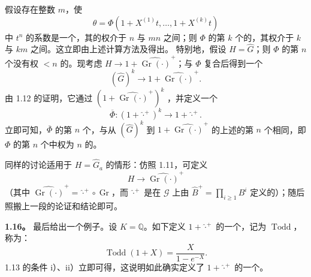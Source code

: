 假设存在整数 $m$，使
\[
\theta=\Phi(1+X^{(1)}t,\ldots,1+X^{(k)}t)
\]
中 $t^n$ 的系数是一个，其的权介于 $n$ 与 $mn$ 之间；则 $\Phi$ 的第 $k$ 个的，其权介于 $k$ 与 $km$ 之间。这立即由上述计算方法及得出。
特别地，假设 $H=\widehat G$；则 $\Phi$ 的第 $n$ 个没有权 $<n$ 的。现考虑 $H\longrightarrow1+\widehat{\operatorname{Gr}(\cdot)}^{+}$；与 $\Phi$ 复合后得到一个
\[
(\widehat G)^k\longrightarrow1+\widehat{\operatorname{Gr}(\cdot)}^{+}.
\]
由 1.12 的证明，它通过 $(1+\widehat{\operatorname{Gr}(\cdot)}^{+})^k$ ，并定义一个
\[
\overline\Phi:(1+\widehat{\cdot}^{+})^k\longrightarrow1+\widehat{\cdot}^{+}.
\]
立即可知，$\overline\Phi$ 的第 $n$ 个，与从 $(\widehat G)^k$ 到 $1+\widehat{\operatorname{Gr}(\cdot)}^{+}$ 的上述的第 $n$ 个相同，即 $\Phi$ 的第 $n$ 个中权为 $n$ 的。

同样的讨论适用于 $H=\widehat G_a$ 的情形：仿照 1.11，可定义
\[
H\longrightarrow\widehat{\operatorname{Gr}(\cdot)}^{+}
\]
（其中 $\widehat{\operatorname{Gr}(\cdot)}^{+}=\widehat{\cdot}^{+}\circ\operatorname{Gr}$，而 $\widehat{\cdot}^{+}$ 是在 $\mathscr G$ 上由 $\widehat B^+=\prod_{i\geqslant1}B^i$ 定义的）；随后照搬上一段的论证和结论即可。

\textbf{1.16。} 最后给出一个例子。设 $K=\mathbb Q$。如下定义 $1+\widehat{\cdot}^{+}$ 的一个，记为 $\operatorname{Todd}$，称为：
\[
\operatorname{Todd}(1+X)=\frac{X}{1-e^{-X}}.
\]
 1.13 的条件 i）、ii）立即可得，这说明如此确实定义了 $1+\widehat{\cdot}^{+}$ 的一个。

